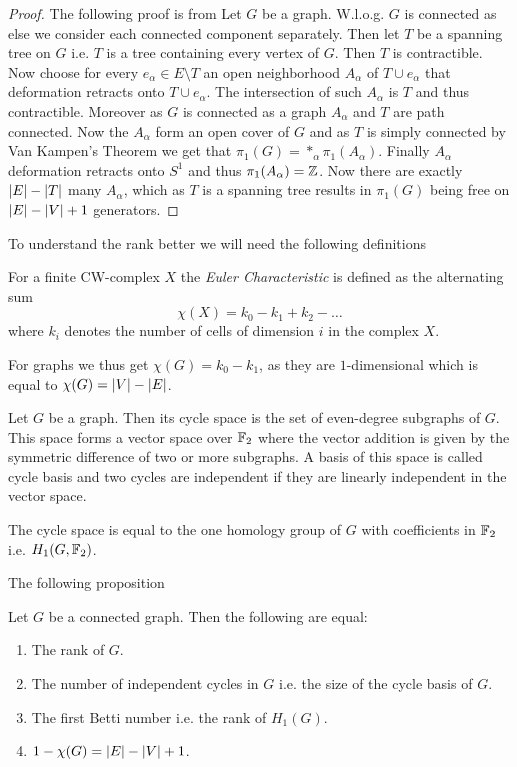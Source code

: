 \begin{proof}
	The following proof is from \cite[p. 43f]{hatcher00}
	Let $G$ be a graph. W.l.o.g. $G$ is connected as else we consider each connected component separately. 
	Then let $T$ be a spanning tree on $G$ i.e. $T$ is a tree containing every vertex of $G$.
	Then $T$ is contractible.
	Now choose for every $e_{\alpha} \in E \setminus T$ an open neighborhood $A_{\alpha}$ of $T \cup e_{\alpha}$ that deformation retracts onto $T \cup e_{\alpha}$.
	The intersection of such $A_{\alpha}$ is $T$ and thus contractible. Moreover as $G$ is connected as a graph $A_{\alpha}$ and $T$ are path connected.
	Now the $A_{\alpha}$ form an open cover of $G$ and as $T$ is simply connected by Van Kampen's Theorem we get that $\pi_{1}(G) = *_{\alpha} \pi_{1}(A_{\alpha})$.
	Finally $A_{\alpha}$ deformation retracts onto $S^{1}$ and thus $\pi_{1}(A_{\alpha}) = \mathbb{Z}$. Now there are exactly $\abs{E} - \abs{T}$ many $A_{\alpha}$,
	which as $T$ is a spanning tree results in $\pi_1(G)$ being free on $\abs{E} - \abs{V} + 1$ generators.
\end{proof}

To understand the rank better we will need the following definitions
\begin{definition}
	For a finite CW-complex $X$ the \emph{Euler Characteristic} is defined as the alternating sum
	\[
		\chi(X) = k_0 - k_1 + k_2 - \ldots
	\] 
	where $k_{i}$ denotes the number of cells of dimension $i$ in the complex $X$.
\end{definition}
For graphs we thus get $\chi (G) = k_0 - k_1$, as they are $1$-dimensional which is equal to $\chi(G) = \abs{V} - \abs{E}$.

\begin{definition}
	Let $G$ be a graph. Then its cycle space is the set of even-degree subgraphs of $G$. 
	This space forms a vector space over $\mathbb{F}_2$ where the vector addition is given by the symmetric difference of two or more subgraphs.
	A basis of this space is called cycle basis and two cycles are independent if they are linearly independent in the vector space.
\end{definition}

\begin{remark}
	The cycle space is equal to the one homology group of $G$ with coefficients in $\mathbb{F}_2$ i.e. $H_1(G,\mathbb{F}_2)$.
\end{remark}

The following proposition 
\begin{proposition}\label{prop:rank}
	Let $G$ be a connected graph. Then the following are equal:
	\begin{enumerate}
		\item The rank of $G$.
		\item The number of independent cycles in $G$ i.e. the size of the cycle basis of $G$.
		\item The first Betti number i.e. the rank of $H_{1}(G)$.
		\item $1 - \chi(G) = \abs{E} - \abs{V} + 1$.
	\end{enumerate}
\end{proposition}


